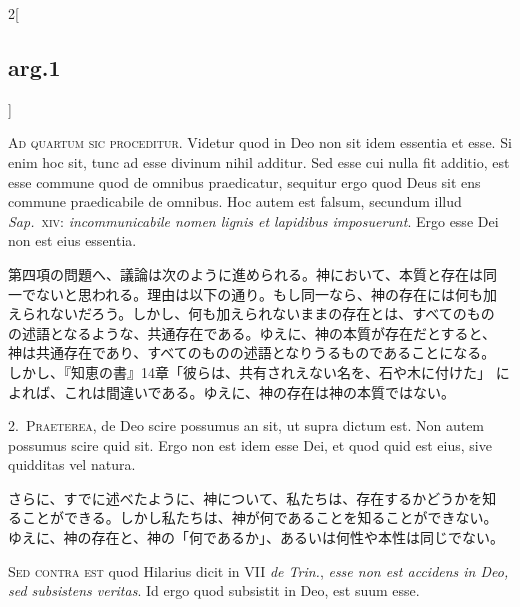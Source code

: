 \documentclass[paper=a4paper,fontsize=10pt,jafontsize=9pt,titlepage]{jlreq}
\begin{document}
\begin{paracol}{2}[\subsection{arg.1}]

{\huge A}\textsc{d quartum sic proceditur}. Videtur quod in Deo non
sit idem essentia et esse.  Si enim hoc sit, tunc ad esse divinum
nihil additur.  Sed esse cui nulla fit additio, est esse commune quod
de omnibus praedicatur, sequitur ergo quod Deus sit ens commune
praedicabile de omnibus.  Hoc autem est falsum, secundum illud
\textit{Sap.}~\textsc{xiv}: \textit{incommunicabile nomen lignis et
lapidibus imposuerunt}.  Ergo esse Dei non est eius essentia.

\switchcolumn

第四項の問題へ、議論は次のように進められる。神において、本質と存在は同
一でないと思われる。理由は以下の通り。もし同一なら、神の存在には何も加
えられないだろう。しかし、何も加えられないままの存在とは、すべてのもの
の述語となるような、共通存在である。ゆえに、神の本質が存在だとすると、
神は共通存在であり、すべてのものの述語となりうるものであることになる。
しかし、『知恵の書』14章「彼らは、共有されえない名を、石や木に付けた」
によれば、これは間違いである。ゆえに、神の存在は神の本質ではない。


2.~\textsc{Praeterea}, de Deo scire possumus an sit, ut supra dictum
est.  Non autem possumus scire quid sit.  Ergo non est idem esse Dei,
et quod quid est eius, sive quidditas vel natura.

\switchcolumn

さらに、すでに述べたように、神について、私たちは、存在するかどうかを知
ることができる。しかし私たちは、神が何であることを知ることができない。
ゆえに、神の存在と、神の「何であるか」、あるいは何性や本性は同じでない。

\switchcolumn*[\subsection{s.c.}]

\textsc{Sed contra est} quod Hilarius dicit in VII \textit{de Trin.},
\textit{esse non est accidens in Deo, sed subsistens veritas}.  Id
ergo quod subsistit in Deo, est suum esse.


\end{paracol}
\end{document}
